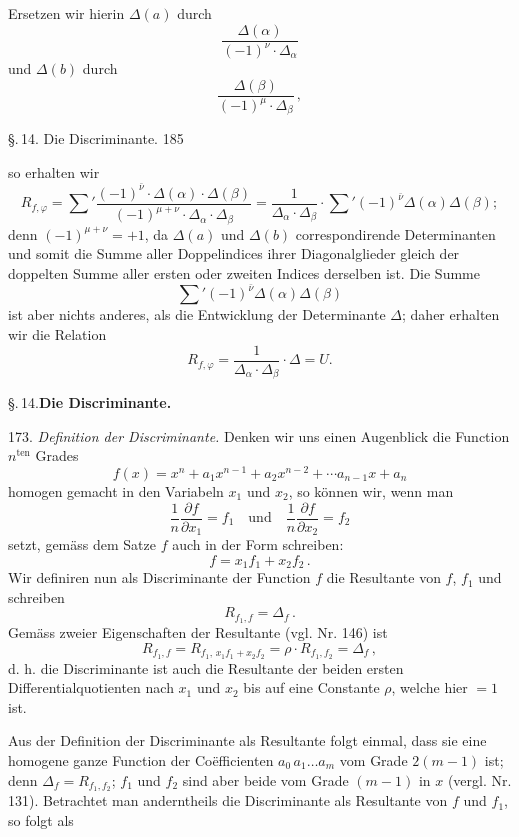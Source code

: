 Ersetzen wir hierin $\Delta(a)$ durch
\[
\dfrac{\Delta(\alpha)}{(-1)^\nu\cdot\Delta_\alpha}
\]
und $\Delta(b)$ durch
\[
\dfrac{\Delta(\beta)}{(-1)^\mu\cdot\Delta_\beta}\,,
\]


\S.\,14. Die Discriminante. 185

so erhalten wir
\[
R_{f,\varphi} = \sum{}'\dfrac{(-1)^{\bar\nu}\cdot\Delta(\alpha)\cdot\Delta(\beta)}{(-1)^{\mu+\nu}\cdot\Delta_\alpha\cdot\Delta_\beta}
= \dfrac{1}{\Delta_\alpha\cdot\Delta_\beta}\cdot\sum{}'(-1)^{\bar\nu}\Delta(\alpha)\Delta(\beta);
\]
denn $(-1)^{\mu+\nu}=+1$, da $\Delta(a)$ und $\Delta(b)$ correspondirende Determinanten und somit die Summe aller Doppelindices ihrer Diagonalglieder gleich der doppelten Summe aller ersten oder zweiten Indices derselben ist. Die Summe
\[
\sum{}'(-1)^{\bar\nu}\Delta(\alpha)\Delta(\beta)
\]
ist aber nichts anderes, als die  Entwicklung der
Determinante $\Delta$; daher erhalten wir die Relation
\[
R_{f,\varphi} = \dfrac{1}{\Delta_\alpha\cdot\Delta_\beta}\cdot\Delta = U.
\]

\begin{center}
\S.\,14.\quad\textbf{Die Discriminante.}
\end{center}

173. \textit{Definition der Discriminante.} Denken wir uns einen Augenblick die Function $n^{\text{ten}}$ Grades
\[
f(x) = x^n + a_1x^{n-1} + a_2x^{n-2} + \cdots a_{n-1}x + a_n
\]
homogen gemacht in den Variabeln $x_1$ und $x_2$, so können wir, wenn man
\[
\frac{1}{n}\frac{\partial f}{\partial x_1} = f_1 \quad\text{und}\quad \frac{1}{n}\frac{\partial f}{\partial x_2} = f_2
\]
setzt, gemäss dem  Satze $f$ auch in der Form
schreiben:
\[
f = x_1f_1 + x_2f_2\,.
\]
Wir definiren nun als Discriminante der Function $f$ die Resultante
von $f$, $f_1$ und schreiben
\[
R_{f_1,f} = \Delta_f\,.
\]
Gemäss zweier Eigenschaften der Resultante (vgl. Nr. 146) ist
\[
R_{f_1,f} = R_{f_1,\,x_1f_1+x_2f_2} = \rho\cdot R_{f_1,f_2} = \Delta_f\,,
\]
d. h. die Discriminante ist auch die Resultante der beiden ersten Differentialquotienten nach $x_1$ und $x_2$ bis auf eine Constante $\rho$, welche
hier $= 1$ ist.

Aus der Definition der Discriminante als Resultante folgt einmal,
dass sie eine homogene ganze Function der Co\"efficienten $a_0\,a_1\ldots a_m$
vom Grade $2(m-1)$ ist; denn $\Delta_f = R_{f_1,f_2}$; $f_1$ und $f_2$ sind aber beide
vom Grade $(m-1)$ in $x$ (vergl. Nr. 131). Betrachtet man anderntheils
die Discriminante als Resultante von $f$ und $f_1$, so folgt als


